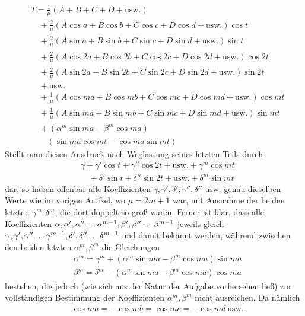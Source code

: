 \[
\begin{aligned}
&T=\frac1\mu(A+B+C+D+\mathrm{usw.})\\[5pt]
&\quad+\frac2\mu(A\cos a+B\cos b+C\cos c+D\cos d+\mathrm{usw.})\cos t\\[5pt]
&\quad+\frac2\mu(A\sin a+B\sin b+C\sin c+D\sin d+\mathrm{usw.})\sin t\\[5pt]
&\quad+\frac2\mu(A\cos2a+B\cos2b+C\cos2c+D\cos2d+\mathrm{usw.})\cos2t\\[5pt]
&\quad+\frac2\mu(A\sin2a+B\sin2b+C\sin2c+D\sin2d+\mathrm{usw.})\sin2t\\[5pt]
&\quad+\mathrm{usw.}\\[5pt]
&\quad+\frac1\mu(A\cos ma+B\cos mb+C\cos mc+D\cos md+\mathrm{usw.})\cos mt\\[5pt]
&\quad+\frac1\mu(A\sin ma+B\sin mb+C\sin mc+D\sin md+\mathrm{usw.})\sin mt\\[5pt]
&\quad+(\alpha^m\sin ma-\beta^m\cos ma)\\[5pt]&\qquad(\sin ma\cos mt-\cos ma\sin mt)
\end{aligned}
\]
Stellt man diesen Ausdruck nach Weglassung seines letzten Teils durch
\[
\begin{aligned}
&\gamma+\gamma'\cos t+\gamma''\cos2t+\mathrm{usw.}+\gamma^m\cos mt\\[5pt]
&\quad+\delta'\sin t+\delta''\sin2t+\mathrm{usw.}+\delta^m\sin mt
\end{aligned}
\]
dar, so haben offenbar alle Koeffizienten $\gamma,\gamma',\delta',\gamma'',\delta''$ usw. genau dieselben Werte wie im vorigen Artikel, wo $\mu=2m+1$ war, mit Ausnahme der beiden letzten $\gamma^m,\delta^m$, die dort doppelt so groß waren. Ferner ist klar, dass alle Koeffizienten
$\alpha,\alpha',\alpha''\mathinner{.\,.\,.}\alpha^{m-1},\beta',\beta''\mathinner{.\,.\,.}\beta^{m-1}$ jeweils gleich $\gamma,\gamma',\gamma''\mathinner{.\,.\,.}\gamma^{m-1},\delta',\delta''\mathinner{.\,.\,.}\delta^{m-1}$ und damit bekannt werden, während zwischen den beiden letzten $\alpha^m,\beta^m$ die Gleichungen
\[
\begin{aligned}
&\alpha^m=\gamma^m+(\alpha^m\sin ma-\beta^m\cos ma)\sin ma\\[5pt]
&\beta^m=\delta^m-(\alpha^m\sin ma-\beta^m\cos ma)\cos ma
\end{aligned}
\]
bestehen, die jedoch (wie sich aus der Natur der Aufgabe vorhersehen ließ) zur vollständigen Bestimmung der Koeffizienten $\alpha^m,\beta^m$ nicht ausreichen. Da nämlich
\[
\begin{aligned}
&\cos ma=-\cos mb=\cos mc=-\cos md\ \mathrm{usw.}
\end{aligned}
\]
